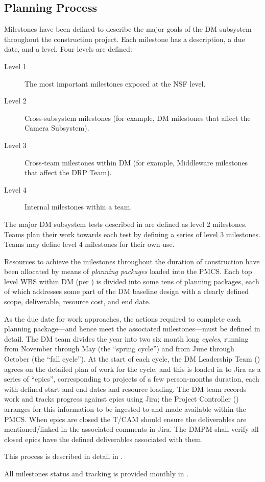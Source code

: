 \subsection{Planning Process}\label{sect:plan}

Milestones have been defined to describe the major goals of the DM subsystem throughout the construction project.
Each milestone has a description, a due date, and a level.
Four levels are defined:

\begin{description}
\item[Level 1]{The most important milestones exposed at the NSF level.}
\item[Level 2]{Cross-subsystem milestones (for example, DM milestones that affect the Camera Subsystem).}
\item[Level 3]{Cross-team milestones within DM (for example, Middleware milestones that affect the DRP Team).}
\item[Level 4]{Internal milestones within a team.}
\end{description}

The major DM subsystem tests described in  are defined as level 2 milestones.
Teams plan their work towards each test by defining a series of level 3 milestones.
Teams may define level 4 milestones for their own use.

Resources to achieve the milestones throughout the duration of construction have been allocated by means of \textit{planning packages} loaded into the PMCS.
Each top level WBS within DM (per ) is divided into some tens of planning packages, each of which addresses some part of the DM baseline design with a clearly defined scope, deliverable, resource cost, and end date.

As the due date for work approaches, the actions required to complete each planning package---and hence meet the associated milestones---must be defined in detail.
The DM team divides the year into two six month long \textit{cycles}, running from November through May (the ``spring cycle'') and from June through October (the ``fall cycle'').
At the start of each cycle, the DM Leadership Team () agrees on the detailed plan of work for the cycle, and this is loaded in to Jira as a series of ``epics'', corresponding to projects of a few person-months duration, each with defined start and end dates and resource loading.
The DM team records work and tracks progress against epics using Jira; the Project Controller () arranges for this information to be ingested to and made available within the PMCS.
When epics are closed the T/CAM should ensure the deliverables are mentioned/linked in the associated comments in Jira. The DMPM shall verify all closed epics have the defined deliverables associated with them.

This process is described in detail in .

All milestones status and tracking is provided monthly in .
